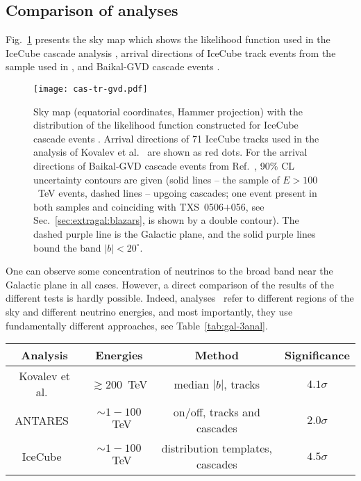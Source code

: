\documentclass[a4paper,noshowpacs,noshowkeys,floatfix,twocolumn,preprintnumbers,nofootinbib]{revtex4-2}
\begin{document}
\subsection{Comparison of analyses}
\label{sec:gal:compare}
Fig.~\ref{fig:sky-gal} presents the sky map which shows the likelihood function used in the IceCube cascade analysis
\cite{IceCube-gal-Science}, arrival directions of IceCube track events from the sample used in \cite{neutgalaxy}, and Baikal-GVD cascade events \cite{Baikal-Nikita}.
\begin{figure}
\centerline{\texttt{[image: cas-tr-gvd.pdf]}}
\caption{\label{fig:sky-gal}
Sky map (equatorial coordinates, Hammer projection) with the distribution of the likelihood function constructed for IceCube cascade events \cite{IceCube-gal-Science}. Arrival directions of 71 IceCube tracks used in the analysis of Kovalev et al.~\cite{neutgalaxy} are shown as red dots. For the arrival directions of Baikal-GVD cascade events from Ref.~\cite{Baikal-Nikita}, 90\% CL uncertainty contours are given (solid lines -- the sample of $E>100$~TeV events, dashed lines -- upgoing cascades; one event present in both samples and coinciding with TXS~0506$+$056, see Sec.~\ref{sec:extragal:blazars}, is shown by a double contour). The dashed purple line is the Galactic plane, and the solid purple lines bound the band $|b|<20^{\circ}$.}
\end{figure}
One can observe some concentration of neutrinos to the broad band near the Galactic plane in all cases. However, a direct comparison of the results of the different tests is hardly possible. Indeed, analyses~\cite{neutgalaxy, ANTARES-ridge, IceCube-gal-Science} refer to different regions of the sky and different neutrino energies, and most importantly, they use fundamentally different approaches, see Table~\ref{tab:gal-3anal}.
\begin{table*}
\begin{center}
\begin{tabular}{cccc}
\hline
\hline
Analysis & Energies & Method & Significance\\
\hline
Kovalev et al.~\cite{neutgalaxy}&$\gtrsim 200$~TeV & median $|b|$, tracks
 & $4.1\sigma$ \\
ANTARES~\cite{ANTARES-ridge}&$\sim 1-100$~TeV & on/off, tracks and cascades &
$2.0\sigma$\\
IceCube~\cite{IceCube-gal-Science}&$\sim 1-100$~TeV & distribution templates, cascades
& $4.5\sigma$ \\
\hline
\hline
\end{tabular}
\end{center}
\caption{\label{tab:gal-3anal}
Analyses (2022-23) in which high-energy neutrinos from our Galaxy were detected.}
\end{table*}
\end{document}
